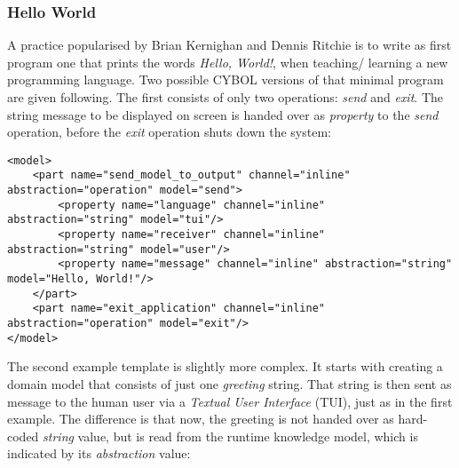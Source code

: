 %
%
%
%
%
%
%

\subsubsection{Hello World}
\label{hello_world_heading}

A practice popularised by Brian Kernighan and Dennis Ritchie
\cite{kernighan1988} is to write as first program one that prints the words
\emph{Hello, World!}, when teaching/ learning a new programming language. Two
possible CYBOL versions of that minimal program are given following. The first
consists of only two operations: \emph{send} and \emph{exit}. The string
message to be displayed on screen is handed over as \emph{property} to the
\emph{send} operation, before the \emph{exit} operation shuts down the system:

\begin{scriptsize}
    \begin{verbatim}
<model>
    <part name="send_model_to_output" channel="inline" abstraction="operation" model="send">
        <property name="language" channel="inline" abstraction="string" model="tui"/>
        <property name="receiver" channel="inline" abstraction="string" model="user"/>
        <property name="message" channel="inline" abstraction="string" model="Hello, World!"/>
    </part>
    <part name="exit_application" channel="inline" abstraction="operation" model="exit"/>
</model>
    \end{verbatim}
\end{scriptsize}

The second example template is slightly more complex. It starts with creating a
domain model that consists of just one \emph{greeting} string. That string is
then sent as message to the human user via a \emph{Textual User Interface}
(TUI), just as in the first example. The difference is that now, the greeting
is not handed over as hard-coded \emph{string} value, but is read from the
runtime knowledge model, which is indicated by its \emph{abstraction} value:

